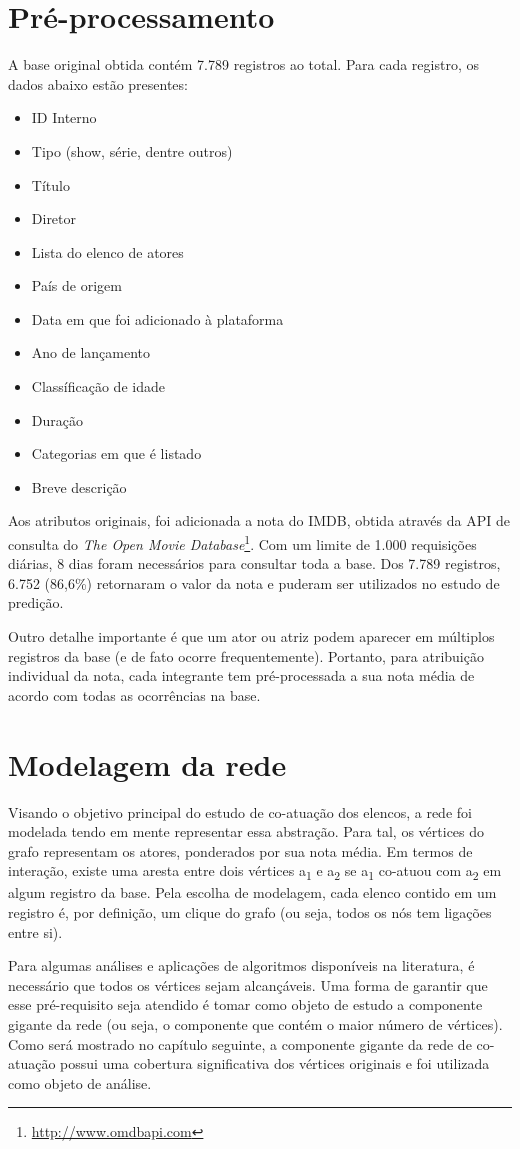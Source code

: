 \section{Pré-processamento}
A base original obtida contém 7.789 registros ao total. Para cada registro, os dados abaixo estão presentes:

\begin{itemize}
	\item ID Interno
	\item Tipo (show, série, dentre outros)
	\item Título
	\item Diretor
	\item Lista do elenco de atores
	\item País de origem
	\item Data em que foi adicionado à plataforma
	\item Ano de lançamento
	\item Classíficação de idade
	\item Duração
	\item Categorias em que é listado
	\item Breve descrição
\end{itemize}

Aos atributos originais, foi adicionada a nota do IMDB, obtida através da API de consulta do \textit{The Open Movie Database}\footnote{\href{http://www.omdbapi.com}{http://www.omdbapi.com}}. Com um limite de 1.000 requisições diárias, 8 dias foram necessários para consultar toda a base. Dos 7.789 registros, 6.752 (86,6\%) retornaram o valor da nota e puderam ser utilizados no estudo de predição.

Outro detalhe importante é que um ator ou atriz podem aparecer em múltiplos registros da base (e de fato ocorre frequentemente). Portanto, para atribuição individual da nota, cada integrante tem pré-processada a sua nota média de acordo com todas as ocorrências na base.


\section{Modelagem da rede}

Visando o objetivo principal do estudo de co-atuação dos elencos, a rede foi modelada tendo em mente representar essa abstração. Para tal, os vértices do grafo representam os atores, ponderados por sua nota média. Em termos de interação, existe uma aresta entre dois vértices a\textsubscript{1} e a\textsubscript{2} se a\textsubscript{1} co-atuou com a\textsubscript{2} em algum registro da base. Pela escolha de modelagem, cada elenco contido em um registro é, por definição, um clique do grafo (ou seja, todos os nós tem ligações entre si).

Para algumas análises e aplicações de algoritmos disponíveis na literatura, é necessário que todos os vértices sejam alcançáveis. Uma forma de garantir que esse pré-requisito seja atendido é tomar como objeto de estudo a componente gigante da rede (ou seja, o componente que contém o maior número de vértices). Como será mostrado no capítulo seguinte, a componente gigante da rede de co-atuação possui uma cobertura significativa dos vértices originais e foi utilizada como objeto de análise.
